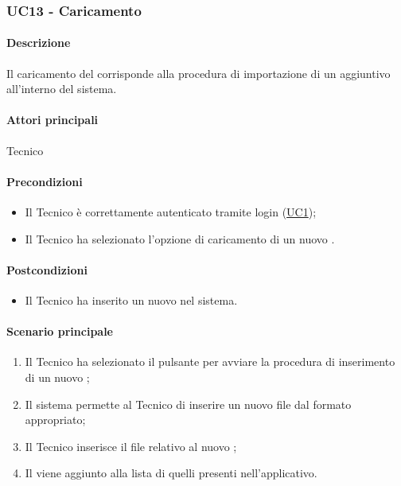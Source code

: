 \subsubsection{UC13 - Caricamento }\label{UC13}
\paragraph*{Descrizione}
Il caricamento del  corrisponde alla procedura di importazione di un  aggiuntivo all’interno del sistema.

\paragraph*{Attori principali}
Tecnico

\paragraph*{Precondizioni}
\begin{itemize}
  \item Il Tecnico è correttamente autenticato tramite login (\hyperref[UC1]{UC1});
  \item Il Tecnico ha selezionato l’opzione di caricamento di un nuovo .  
\end{itemize}

\paragraph*{Postcondizioni}
\begin{itemize}
  \item Il Tecnico ha inserito un nuovo  nel sistema.
\end{itemize}

\paragraph*{Scenario principale}
\begin{enumerate}
  \item Il Tecnico ha selezionato il pulsante per avviare la procedura di inserimento di un nuovo ;
  \item Il sistema permette al Tecnico di inserire un nuovo file dal formato appropriato;
  \item Il Tecnico inserisce il file relativo al nuovo ;
  \item Il  viene aggiunto alla lista di quelli presenti nell’applicativo.  
\end{enumerate}

